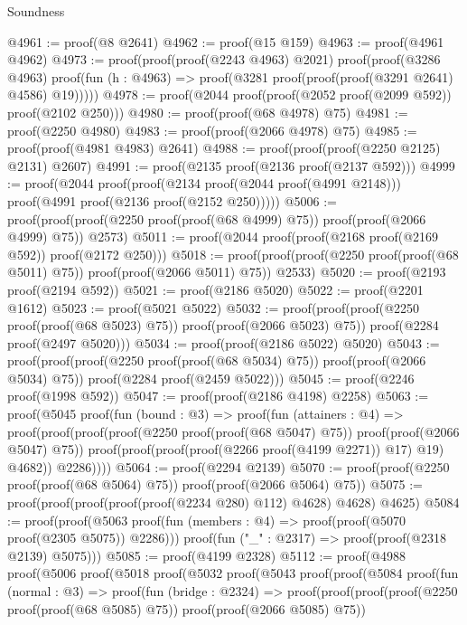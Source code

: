 \begin{lexlean}{Soundness}
\begin{coremodule}
@4961 := proof(@8 @2641)
@4962 := proof(@15 @159)
@4963 := proof(@4961 @4962)
@4973 := proof(proof(proof(@2243 @4963) @2021)
      proof(proof(@3286 @4963)
          proof(fun (h : @4963) => proof(@3281 proof(proof(proof(@3291 @2641) @4586) @19)))))
@4978 := proof(@2044 proof(proof(@2052 proof(@2099 @592)) proof(@2102 @250)))
@4980 := proof(proof(@68 @4978) @75)
@4981 := proof(@2250 @4980)
@4983 := proof(proof(@2066 @4978) @75)
@4985 := proof(proof(@4981 @4983) @2641)
@4988 := proof(proof(proof(@2250 @2125) @2131) @2607)
@4991 := proof(@2135 proof(@2136 proof(@2137 @592)))
@4999 := proof(@2044
      proof(proof(@2134 proof(@2044 proof(@4991 @2148)))
          proof(@4991 proof(@2136 proof(@2152 @250)))))
@5006 := proof(proof(proof(@2250 proof(proof(@68 @4999) @75)) proof(proof(@2066 @4999) @75)) @2573)
@5011 := proof(@2044 proof(proof(@2168 proof(@2169 @592)) proof(@2172 @250)))
@5018 := proof(proof(proof(@2250 proof(proof(@68 @5011) @75)) proof(proof(@2066 @5011) @75)) @2533)
@5020 := proof(@2193 proof(@2194 @592))
@5021 := proof(@2186 @5020)
@5022 := proof(@2201 @1612)
@5023 := proof(@5021 @5022)
@5032 := proof(proof(proof(@2250 proof(proof(@68 @5023) @75)) proof(proof(@2066 @5023) @75))
      proof(@2284 proof(@2497 @5020)))
@5034 := proof(proof(@2186 @5022) @5020)
@5043 := proof(proof(proof(@2250 proof(proof(@68 @5034) @75)) proof(proof(@2066 @5034) @75))
      proof(@2284 proof(@2459 @5022)))
@5045 := proof(@2246 proof(@1998 @592))
@5047 := proof(proof(@2186 @4198) @2258)
@5063 := proof(@5045
      proof(fun (bound : @3) =>
        proof(fun (attainers : @4) =>
          proof(proof(proof(proof(@2250 proof(proof(@68 @5047) @75)) proof(proof(@2066 @5047) @75))
                proof(proof(proof(proof(@2266 proof(@4199 @2271)) @17) @19) @4682))
              @2286))))
@5064 := proof(@2294 @2139)
@5070 := proof(proof(@2250 proof(proof(@68 @5064) @75)) proof(proof(@2066 @5064) @75))
@5075 := proof(proof(proof(proof(proof(@2234 @280) @112) @4628) @4628) @4625)
@5084 := proof(proof(@5063
        proof(fun (members : @4) => proof(proof(@5070 proof(@2305 @5075)) @2286)))
      proof(fun ("_" : @2317) => proof(proof(@2318 @2139) @5075)))
@5085 := proof(@4199 @2328)
@5112 := proof(@4988
      proof(@5006
          proof(@5018
              proof(@5032
                  proof(@5043
                      proof(proof(@5084
                            proof(fun (normal : @3) =>
                              proof(fun (bridge : @2324) =>
                                proof(proof(proof(proof(@2250 proof(proof(@68 @5085) @75))
                                        proof(proof(@2066 @5085) @75))

\end{coremodule}
\end{lexlean}

